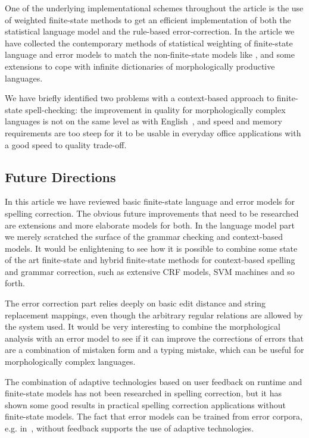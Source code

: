 \documentclass[a4paper,12pt]{article}
\begin{document}
One of the underlying implementational schemes throughout the article is the
use of weighted finite-state methods to get an efficient implementation of both
the statistical language model and the rule-based error-correction. In the
article we have collected the contemporary methods of statistical weighting of
finite-state language and error models to match the non-finite-state models
like \cite{church1991probability}, and some extensions to cope with infinite
dictionaries of morphologically productive languages.

We have briefly identified two problems with a context-based approach to
finite-state spell-checking: the improvement in quality for morphologically
complex languages is not on the same level as with
English~\cite[]{wilcoxohearn2008realword}, and speed and memory requirements
are too steep for it to be usable in everyday office applications with a good
speed to quality trade-off.

\subsection{Future Directions}
\label{subsec:future}

In this article we have reviewed basic finite-state language and error models
for spelling correction. The obvious future improvements that need to be
researched are extensions and more elaborate models for both. In the language
model part we merely scratched the surface of the grammar checking and
context-based models. It would be enlightening to see how it is possible to
combine some state of the art finite-state and hybrid finite-state methods for
context-based spelling and grammar correction, such as extensive CRF models,
SVM machines and so forth.

The error correction part relies deeply on basic edit distance and string
replacement mappings, even though the arbitrary regular relations are allowed
by the system used. It would be very interesting to combine the morphological
analysis with an error model to see if it can improve the corrections of errors
that are a combination of mistaken form and a typing mistake, which can be
useful for morphologically complex languages.

The combination of adaptive technologies based on user feedback on runtime and
finite-state models has not been researched in spelling correction, but it has
shown some good results in practical spelling correction applications without
finite-state models. The fact that error models can be trained from error
corpora,  e.g. in~\cite{church1991probability}, without feedback supports the
use of adaptive technologies.
\end{document}
